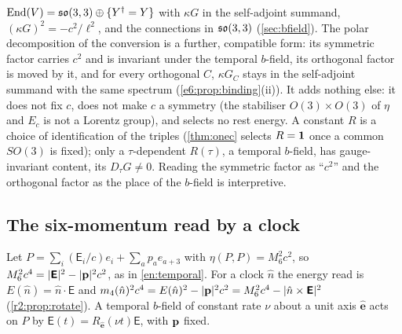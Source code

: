 \begin{remark}
\begin{enumerate}[label=(\alph*),leftmargin=2.2em]
$\operatorname{End}(V)=\mathfrak{so}(3,3)\oplus\{Y^\dagger=Y\}$ with $\kappa G$ in the self-adjoint summand, $(\kappa G)^2=-c^2/\ell^2$, and the connections in $\mathfrak{so}(3,3)$ (\cref{sec:bfield}). The polar decomposition of the conversion is a further, compatible form: its symmetric factor carries $c^2$ and is invariant under the
temporal $b$-field, its orthogonal factor is moved by it, and for every orthogonal $C$, $\kappa G_C$ stays in the self-adjoint summand with the same
spectrum (\cref{e6:prop:binding}(ii)). It adds nothing else: it does not fix $c$, does not make $c$ a symmetry (the stabiliser $O(3)\times O(3)$ of $\eta$
and $E_c$ is not a Lorentz group), and selects no rest energy. A constant $R$ is a choice of identification of the triples (\cref{thm:onec} selects $R=\mathbf 1$ once a common $SO(3)$ is fixed); only a $\tau$-dependent $R(\tau)$, a temporal $b$-field, has gauge-invariant content, its
$D_\tau G\neq0$. Reading the symmetric factor as ``$c^2$'' and the orthogonal factor as the place of the $b$-field is interpretive.
\end{enumerate}
\end{remark}

\subsection{The six-momentum read by a clock}
\label{e6:sec:clock}

Let $P=\sum_i(\mathsf E_i/c)e_i+\sum_ap_ae_{a+3}$ with $\eta(P,P)=M_6^2c^2$, so $M_6^2c^4=|\boldsymbol{\mathsf E}|^2-|\mathbf p|^2c^2$, as in \cref{en:temporal}.
For a clock $\hat n$ the energy read is $E(\hat n)=\hat n\cdot\boldsymbol{\mathsf E}$ and $m_4(\hat n)^2c^4=E(\hat n)^2-|\mathbf p|^2c^2=M_6^2c^4-|\hat n\times\boldsymbol{\mathsf E}|^2$ (\cref{r2:prop:rotate}). A temporal $b$-field of constant rate $\nu$ about a unit axis $\hat{\mathbf e}$ acts on $P$ by $\boldsymbol{\mathsf E}(t)=R_{\hat{\mathbf e}}(\nu t)\boldsymbol{\mathsf E}$,
with $\mathbf p$ fixed.

